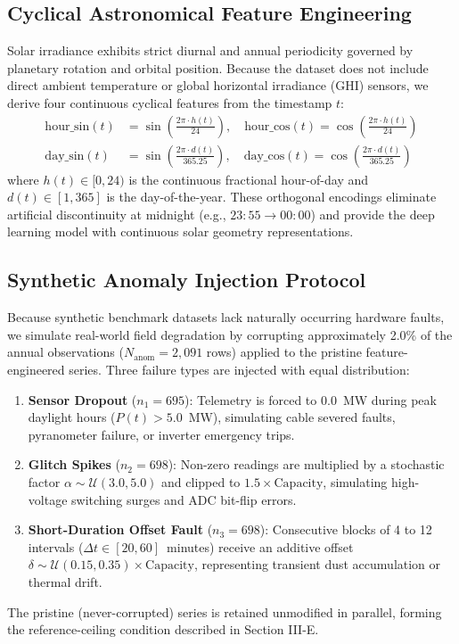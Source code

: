 \documentclass[conference]{IEEEtran}
\begin{document}
\subsection{Cyclical Astronomical Feature Engineering}
Solar irradiance exhibits strict diurnal and annual periodicity governed by planetary rotation and orbital position. Because the dataset does not include direct ambient temperature or global horizontal irradiance (GHI) sensors, we derive four continuous cyclical features from the timestamp $t$:
\begin{align}
\text{hour\_sin}(t) &= \sin\!\left(\frac{2\pi \cdot h(t)}{24}\right), \quad
\text{hour\_cos}(t) = \cos\!\left(\frac{2\pi \cdot h(t)}{24}\right) \\
\text{day\_sin}(t) &= \sin\!\left(\frac{2\pi \cdot d(t)}{365.25}\right), \quad
\text{day\_cos}(t) = \cos\!\left(\frac{2\pi \cdot d(t)}{365.25}\right)
\end{align}
where $h(t) \in [0, 24)$ is the continuous fractional hour-of-day and $d(t) \in [1, 365]$ is the day-of-the-year. These orthogonal encodings eliminate artificial discontinuity at midnight (e.g., $23{:}55 \to 00{:}00$) and provide the deep learning model with continuous solar geometry representations.

\subsection{Synthetic Anomaly Injection Protocol}
Because synthetic benchmark datasets lack naturally occurring hardware faults, we simulate real-world field degradation by corrupting approximately 2.0\% of the annual observations ($N_{\text{anom}} = 2{,}091$ rows) applied to the pristine feature-engineered series. Three failure types are injected with equal distribution:
\begin{enumerate}
    \item \textbf{Sensor Dropout} ($n_1 = 695$): Telemetry is forced to $0.0$~MW during peak daylight hours ($P(t) > 5.0$~MW), simulating cable severed faults, pyranometer failure, or inverter emergency trips.
    \item \textbf{Glitch Spikes} ($n_2 = 698$): Non-zero readings are multiplied by a stochastic factor $\alpha \sim \mathcal{U}(3.0, 5.0)$ and clipped to $1.5 \times \text{Capacity}$, simulating high-voltage switching surges and ADC bit-flip errors.
    \item \textbf{Short-Duration Offset Fault} ($n_3 = 698$): Consecutive blocks of 4 to 12 intervals ($\Delta t \in [20, 60]$~minutes) receive an additive offset $\delta \sim \mathcal{U}(0.15, 0.35) \times \text{Capacity}$, representing transient dust accumulation or thermal drift.
\end{enumerate}
The pristine (never-corrupted) series is retained unmodified in parallel, forming the reference-ceiling condition described in Section III-E.
\end{document}
